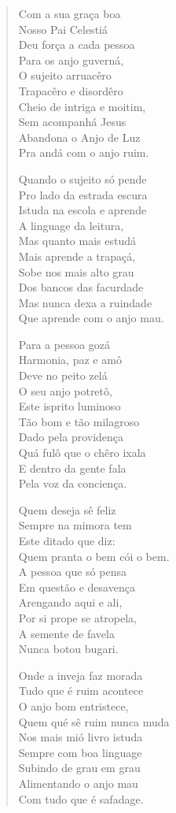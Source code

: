 \begin{verse}
Com a sua graça boa\\
Nosso Pai Celestiá\\
Deu força a cada pessoa\\
Para os anjo guverná,\\
O sujeito arruacêro\\
Trapacêro e disordêro\\
Cheio de intriga e moitim,\\
Sem acompanhá Jesus\\
Abandona o Anjo de Luz\\
Pra andá com o anjo ruim.

Quando o sujeito só pende\\
Pro lado da estrada escura\\
Istuda na escola e aprende\\
A linguage da leitura,\\
Mas quanto mais estudá\\
Mais aprende a trapaçá,\\
Sobe nos mais alto grau\\
Dos bancos das facurdade\\
Mas nunca dexa a ruindade\\
Que aprende com o anjo mau.

Para a pessoa gozá\\
Harmonia, paz e amô\\
Deve no peito zelá\\
O seu anjo potretô,\\
Este isprito luminoso\\
Tão bom e tão milagroso\\
Dado pela providença\\
Quá fulô que o chêro ixala\\
E dentro da gente fala\\
Pela voz da conciença.

Quem deseja sê feliz\\
Sempre na mimora tem\\
Este ditado que diz:\\
Quem pranta o bem cói o bem.\\
A pessoa que só pensa\\
Em questão e desavença\\
Arengando aqui e ali,\\
Por si prope se atropela,\\
A semente de favela\\
Nunca botou bugari.

Onde a inveja faz morada\\
Tudo que é ruim acontece\\
O anjo bom entristece,\\
Quem qué sê ruim nunca muda\\
Nos mais mió livro istuda\\
Sempre com boa linguage\\
Subindo de grau em grau\\
Alimentando o anjo mau\\
Com tudo que é safadage.


\end{verse}
